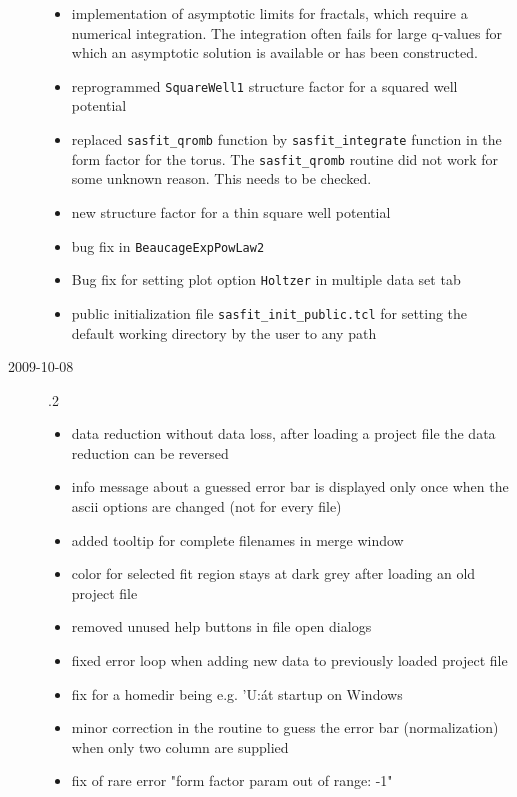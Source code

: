\begin{description}
\begin{itemize}
        \item implementation of asymptotic limits for fractals, which require a
              numerical integration. The integration often fails for large q-values
              for which an asymptotic solution is available or has been constructed.
        \item reprogrammed \texttt{SquareWell1} structure factor for a squared well potential
        \item replaced \texttt{sasfit\_qromb} function by \texttt{sasfit\_integrate} function in the
              form factor for the torus. The \texttt{sasfit\_qromb} routine did not work for some
              unknown reason. This needs to be checked.
        \item new structure factor for a thin square well potential
        \item bug fix in \texttt{BeaucageExpPowLaw2}
        \item Bug fix for setting plot option
              \texttt{Holtzer} in multiple data set tab
        \item public initialization file \texttt{sasfit\_init\_public.tcl} for setting
              the default working directory by the user to any path
        \end{itemize}
    \item[2009-10-08] .2
        \begin{itemize}
          \item data reduction without data loss, after loading a project file the data reduction can be reversed
          \item info message about a guessed error bar is displayed only once when the ascii options are changed
                (not for every file)
          \item added tooltip for complete filenames in merge window
          \item color for selected fit region stays at dark grey after loading an old project file
          \item removed unused help buttons in file open dialogs
          \item fixed error loop when adding new data to previously loaded project file
          \item fix for a homedir being e.g. 'U:\' at startup on Windows
          \item minor correction in the routine to guess the error bar (normalization) when only two column are supplied
          \item fix of rare error "form factor param out of range: -1"

\end{itemize}
\end{description}

